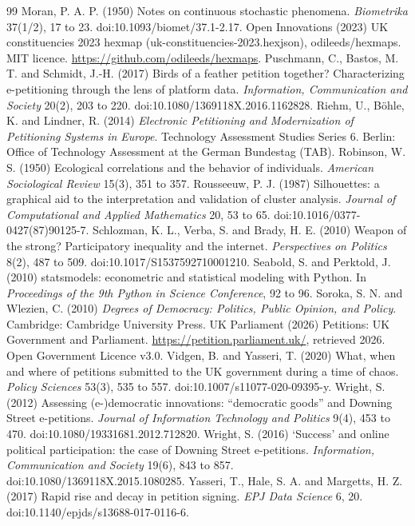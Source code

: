 \documentclass[11pt,a4paper]{article}
\begin{document}
\begin{thebibliography}{99}
 Moran, P. A. P. (1950) Notes on continuous stochastic phenomena. \textit{Biometrika} 37(1/2), 17 to 23. doi:10.1093/biomet/37.1-2.17.
 Open Innovations (2023) UK constituencies 2023 hexmap (uk-constituencies-2023.hexjson), odileeds/hexmaps. MIT licence. \url{https://github.com/odileeds/hexmaps}.
 Puschmann, C., Bastos, M. T. and Schmidt, J.-H. (2017) Birds of a feather petition together? Characterizing e-petitioning through the lens of platform data. \textit{Information, Communication and Society} 20(2), 203 to 220. doi:10.1080/1369118X.2016.1162828.
 Riehm, U., B\"ohle, K. and Lindner, R. (2014) \textit{Electronic Petitioning and Modernization of Petitioning Systems in Europe}. Technology Assessment Studies Series 6. Berlin: Office of Technology Assessment at the German Bundestag (TAB).
 Robinson, W. S. (1950) Ecological correlations and the behavior of individuals. \textit{American Sociological Review} 15(3), 351 to 357.
 Rousseeuw, P. J. (1987) Silhouettes: a graphical aid to the interpretation and validation of cluster analysis. \textit{Journal of Computational and Applied Mathematics} 20, 53 to 65. doi:10.1016/0377-0427(87)90125-7.
 Schlozman, K. L., Verba, S. and Brady, H. E. (2010) Weapon of the strong? Participatory inequality and the internet. \textit{Perspectives on Politics} 8(2), 487 to 509. doi:10.1017/S1537592710001210.
 Seabold, S. and Perktold, J. (2010) statsmodels: econometric and statistical modeling with Python. In \textit{Proceedings of the 9th Python in Science Conference}, 92 to 96.
 Soroka, S. N. and Wlezien, C. (2010) \textit{Degrees of Democracy: Politics, Public Opinion, and Policy}. Cambridge: Cambridge University Press.
 UK Parliament (2026) Petitions: UK Government and Parliament. \url{https://petition.parliament.uk/}, retrieved 2026. Open Government Licence v3.0.
 Vidgen, B. and Yasseri, T. (2020) What, when and where of petitions submitted to the UK government during a time of chaos. \textit{Policy Sciences} 53(3), 535 to 557. doi:10.1007/s11077-020-09395-y.
 Wright, S. (2012) Assessing (e-)democratic innovations: ``democratic goods'' and Downing Street e-petitions. \textit{Journal of Information Technology and Politics} 9(4), 453 to 470. doi:10.1080/19331681.2012.712820.
 Wright, S. (2016) `Success' and online political participation: the case of Downing Street e-petitions. \textit{Information, Communication and Society} 19(6), 843 to 857. doi:10.1080/1369118X.2015.1080285.
 Yasseri, T., Hale, S. A. and Margetts, H. Z. (2017) Rapid rise and decay in petition signing. \textit{EPJ Data Science} 6, 20. doi:10.1140/epjds/s13688-017-0116-6.
\end{thebibliography}
\end{document}
